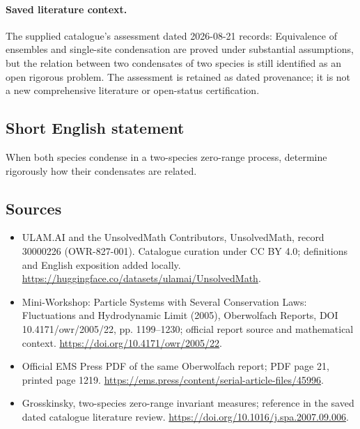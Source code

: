 \documentclass[11pt]{article}
\begin{document}
\paragraph{Saved literature context.} The supplied catalogue's assessment dated 2026-08-21 records: Equivalence of ensembles and single-site condensation are proved under substantial assumptions, but the relation between two condensates of two species is still identified as an open rigorous problem. The assessment is retained as dated provenance; it is not a new comprehensive literature or open-status certification.
\subsection{Short English statement}
When both species condense in a two-species zero-range process, determine rigorously how their condensates are related.
\subsection{Sources}
\begin{itemize}
\item[\hypertarget{source:30000226:1}{S1}] ULAM.AI and the UnsolvedMath Contributors, UnsolvedMath, record 30000226 (OWR-827-001). Catalogue curation under CC BY 4.0; definitions and English exposition added locally.
\url{https://huggingface.co/datasets/ulamai/UnsolvedMath}.
\item[\hypertarget{source:30000226:2}{S2}] Mini-Workshop: Particle Systems with Several Conservation Laws: Fluctuations and Hydrodynamic Limit (2005), Oberwolfach Reports, DOI 10.4171/owr/2005/22, pp. 1199--1230; official report source and mathematical context.
\url{https://doi.org/10.4171/owr/2005/22}.
\item[\hypertarget{source:30000226:3}{S3}] Official EMS Press PDF of the same Oberwolfach report; PDF page 21, printed page 1219.
\url{https://ems.press/content/serial-article-files/45996}.
\item[\hypertarget{source:30000226:4}{S4}] Grosskinsky, two-species zero-range invariant measures; reference in the saved dated catalogue literature review.
\url{https://doi.org/10.1016/j.spa.2007.09.006}.
\end{itemize}
\label{end:30000226}
\end{document}
